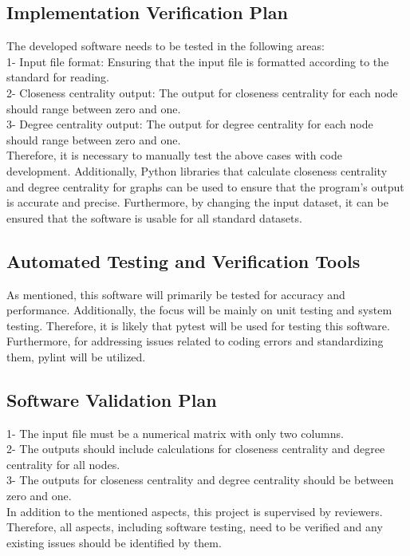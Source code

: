 \documentclass[12pt, titlepage]{article}
\begin{document}
\subsection{Implementation Verification Plan}


The developed software needs to be tested in the following areas:\\
1- Input file format: Ensuring that the input file is formatted according to the standard for reading.\\
2- Closeness centrality output: The output for closeness centrality for each node should range between zero and one.\\
3- Degree centrality output: The output for degree centrality for each node should range between zero and one.\\
Therefore, it is necessary to manually test the above cases with code development. Additionally, Python libraries that calculate closeness centrality and degree centrality for graphs can be used to ensure that the program's output is accurate and precise.
Furthermore, by changing the input dataset, it can be ensured that the software is usable for all standard datasets.

\subsection{Automated Testing and Verification Tools}

As mentioned, this software will primarily be tested for accuracy and performance. Additionally, the focus will be mainly on unit testing and system testing. Therefore, it is likely that pytest will be used for testing this software. Furthermore, for addressing issues related to coding errors and standardizing them, pylint will be utilized.

\subsection{Software Validation Plan}

1- The input file must be a numerical matrix with only two columns.\\
2- The outputs should include calculations for closeness centrality and degree  centrality for all nodes.\\
3- The outputs for closeness centrality and degree  centrality should be between zero and one.\\
In addition to the mentioned aspects, this project is supervised by reviewers. Therefore, all aspects, including software testing, need to be verified and any existing issues should be identified by them.
\end{document}
